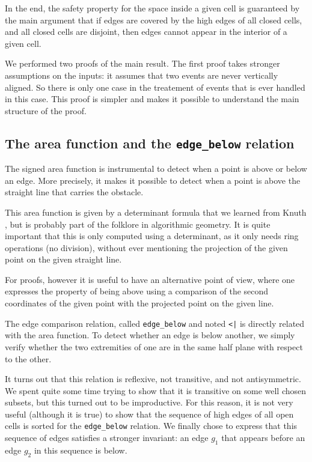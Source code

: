 \documentclass[a4paper, USenglish, cleveref, autoref, thm-restate]{lipics-v2021}
\begin{document}
In the end, the safety property for the space inside a given cell is
guaranteed by the main argument that if edges are covered by the high
edges of all closed cells, and all closed cells are disjoint, then
edges cannot appear in the interior of a given cell.

We performed two proofs of the main result.  The first proof takes
stronger assumptions on the inputs: it assumes that two events are
never vertically aligned.  So there is only one case in the treatement
of events that is ever handled in this case.  This proof is simpler
and makes it possible to understand the main structure of the proof.

\subsection{The area function and the {\tt edge\_below} relation}
The signed area function is instrumental to detect when a point is above or
below an edge.  More precisely, it makes it possible to detect when a
point is above the straight line that carries the obstacle.

This area function is given by a determinant formula that we learned
from Knuth \cite{Knuth}, but is probably part of the folklore in algorithmic
geometry.  It is quite important that this is only computed using a
determinant, as it only needs ring operations (no division), without
ever mentioning the projection of the given point on the given
straight line.

For proofs, however it is useful to have an alternative point of view,
where one expresses the property of being above using a comparison of
the second coordinates of the given point with the projected point on
the given line.

The edge comparison relation, called {\tt edge\_below} and
noted {\tt <|} is directly related with the area
function.  To detect whether an edge is below another, we simply
verify whether the two extremities of one are in the same half plane
with respect to the other.

It turns out that this relation is reflexive, not transitive, and not
antisymmetric.  We spent quite some time trying to show that it is transitive
on some well chosen subsets, but this turned out to be improductive.  For
this reason, it is not very useful (although it is true) to show that the
sequence of high edges of all open cells is sorted for the {\tt edge\_below}
relation.  We
finally chose to express that this sequence of edges
satisfies a stronger invariant: an edge \(g_1\) that appears before an edge
\(g_2\) in this sequence is below.
\end{document}
